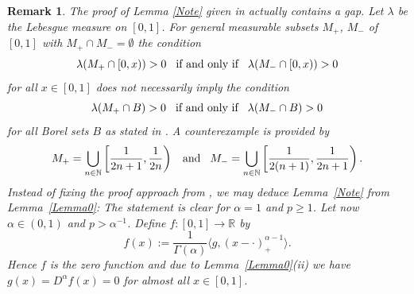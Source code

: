 \documentclass[12pt]{article}
\newtheorem{remark}{Remark}
\newenvironment{proof}{\begin{trivlist}
    \item[\hskip\labelsep{\it Proof.}]}{$\hfill\Box$\end{trivlist}}
\newcommand{\NN}{\mathbb{N}}
\newcommand{\RR}{\mathbb{R}}
\begin{document}
\begin{remark}\label{Rem:Proof_Gap}
The proof of Lemma \ref{Note} given in \cite{D08} actually contains
a gap. Let $\lambda$ be the Lebesgue measure on $[0,1]$.
For general measurable subsets $M_+$, $M_-$ of $[0,1]$ with
$M_+\cap M_-=\emptyset$ the condition
\begin{equation*}
\lambda(M_+ \cap [0,x)) >0
\hspace{2ex}\text{if and only if}\hspace{2ex}
\lambda(M_- \cap [0,x)) >0
\end{equation*}
for all $x\in [0,1]$ does not necessarily imply the condition
\begin{equation*}
\lambda(M_+ \cap B) >0
\hspace{2ex}\text{if and only if}\hspace{2ex}
\lambda(M_- \cap B) >0
\end{equation*}
for all Borel sets $B$ as stated in \cite{D08}.
A counterexample is provided by
\begin{equation*}
M_+ = \bigcup_{n\in\NN} \left[ \frac{1}{2n+1}, \frac{1}{2n} \right)
\hspace{2ex}\text{and}\hspace{2ex}
M_- = \bigcup_{n\in\NN} \left[ \frac{1}{2(n+1)}, \frac{1}{2n+1} \right).
\end{equation*}
Instead of fixing the proof approach from \cite{D08}, we 
may deduce Lemma~\ref{Note} from Lemma~\ref{Lemma0}: The statement is clear for $\alpha =1$ and $p\ge 1$. Let now $\alpha \in (0,1)$ and $p> \alpha^{-1}$. Define $f: [0,1] \to \RR$ by 
$$
f(x) := \frac{1}{\Gamma(\alpha)} \langle g, (x-\cdot)^{\alpha - 1}_+ \rangle.
$$
Hence $f$ is the zero function and due to Lemma~\ref{Lemma0}(ii) we have $g(x)= D^{\alpha} f(x) = 0 $ for almost all $x\in [0,1]$.
\end{remark}

\end{document}
